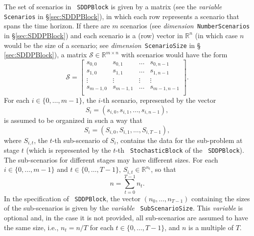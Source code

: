 \documentclass[a4paper]{article}
\def\dimension{\textit{dimension}\xspace}
\def\variable{\textit{variable}\xspace}
\newcommand{\code}[1]{\textrm{\texttt{\hyphenchar\font=200 #1}}}
\newcommand{\cstr}[1]{\code{#1}}
\begin{document}
The set of scenarios in \code{SDDPBlock} is given by a matrix (see the
\variable \cstr{Scenarios} in \S \ref{sec:SDDPBlock}), in which each row
represents a scenario that spans the time horizon. If there are $m$ scenarios
(see \dimension \cstr{NumberScenarios} in \S \ref{sec:SDDPBlock}) and each
scenario is a (row) vector in $\mathbb{R}^n$ (in which case $n$ would be the
size of a scenario; see \dimension \cstr{ScenarioSize} in \S
\ref{sec:SDDPBlock}), a matrix $\mathcal{S} \in \mathbb{R}^{m \times n}$ with
scenarios would have the form
\[
\mathcal{S} = \left[
\begin{array}{cccc}
  s_{0,0}   & s_{0,1}   & \dots  & s_{0, n-1}\\
  s_{1,0}   & s_{1,1}   & \dots  & s_{1, n-1}\\
  \vdots    & \vdots    & \vdots & \vdots \\
  s_{m-1,0} & s_{m-1,1} & \dots  & s_{m-1, n-1}\\
\end{array}
\right].
\]
For each $i \in \{ 0, \dots, m-1 \}$, the $i$-th scenario, represented by the vector
\[
S_i = \left( s_{i,0},  s_{i,1} , \dots , s_{i, n-1} \right),
\]
is assumed to be organized in such a way that
\[
S_i = \left( S_{i,0},  S_{i,1} , \dots , S_{i, T-1} \right),
\]
where $S_{i,t}$, the $t$-th sub-scenario of $S_i$, contains the data for the
sub-problem at stage $t$ (which is represented by the $t$-th
\code{StochasticBlock} of the \code{SDDPBlock}). The sub-scenarios for
different stages may have different sizes. For each $i \in \{ 0, \dots, m-1 \}$
and $t \in \{0, \dots, T-1\}$, $S_{i,t} \in \mathbb{R}^{n_t}$, so that
\[
n = \sum_{t = 0}^{T-1} n_t.
\]
In the specification of \code{SDDPBlock}, the vector $( n_0, \dots, n_{T-1})$
containing the sizes of the sub-scenarios is given by the \variable
\cstr{SubScenarioSize}. This \variable is optional and, in the case it is not
provided, all sub-scenarios are assumed to have the same size, i.e., $n_t = n
/ T$ for each $t \in \{0, \dots, T-1\}$, and $n$ is a multiple of $T$.
\end{document}

